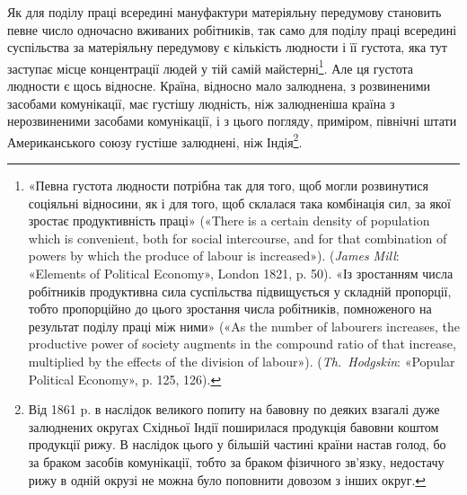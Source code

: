 Як для поділу праці всередині мануфактури матеріяльну передумову
становить певне число одночасно вживаних робітників,
так само для поділу праці всередині суспільства за матеріяльну
передумову є кількість людности і її густота, яка тут заступає
місце концентрації людей у тій самій майстерні\footnote{
«Певна густота людности потрібна так для того, щоб могли розвинутися
соціяльні відносини, як і для того, щоб склалася така комбінація
сил, за якої зростає продуктивність праці» («There is a certain
density of population which is convenient, both for social intercourse,
and for that combination of powers by which the produce of labour is increased»).
(\emph{James Mill}: «Elements of Political Economy», London 1821,
p. 50). «Із зростанням числа робітників продуктивна сила суспільства
підвищується у складній пропорції, тобто пропорційно до цього зростання
числа робітників, помноженого на результат поділу праці між ними»
(«As the number of labourers increases, the productive power of society
augments in the compound ratio of that increase, multiplied by the
effects of the division of labour»). (\emph{Th.~Hodgskin}: «Popular Political Economy»,
p. 125, 126).
}. Але ця густота
людности є щось відносне. Країна, відносно мало залюднена,
з розвиненими засобами комунікації, має густішу людність, ніж
залюдненіша країна з нерозвиненими засобами комунікації, і з
цього погляду, приміром, північні штати Американського союзу
густіше залюднені, ніж Індія\footnote{
Від 1861 p. в наслідок великого попиту на бавовну по деяких
взагалі дуже залюднених округах Східньої Індії поширилася продукція
бавовни коштом продукції рижу. В наслідок цього у більшій частині
країни настав голод, бо за браком засобів комунікації, тобто за браком
фізичного зв'язку, недостачу рижу в одній окрузі не можна було поповнити
довозом з інших округ.
}.

